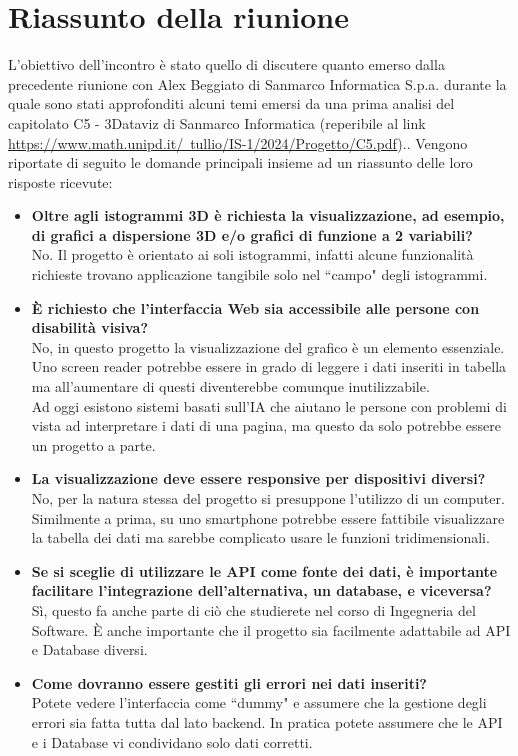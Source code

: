\section{Riassunto della riunione}
L'obiettivo dell'incontro  è stato quello di discutere quanto emerso dalla precedente riunione con 
    Alex Beggiato di Sanmarco Informatica S.p.a. durante la quale sono stati approfonditi alcuni temi emersi da una prima analisi del capitolato C5 - 3Dataviz di Sanmarco Informatica (reperibile al link \href{https://www.math.unipd.it/~tullio/IS-1/2024/Progetto/C5.pdf}{https://www.math.unipd.it/~tullio/IS-1/2024/Progetto/C5.pdf})..
Vengono riportate di seguito le domande principali insieme ad un riassunto delle loro risposte ricevute:
\begin{itemize}
    \item \textbf{Oltre agli istogrammi 3D è richiesta la visualizzazione, ad esempio, di grafici a dispersione 3D e/o grafici di funzione a 2 variabili?}\\
    No. Il progetto è orientato ai soli istogrammi, infatti alcune funzionalità richieste trovano applicazione tangibile solo nel ``campo" degli istogrammi.
    \item \textbf{È richiesto che l'interfaccia Web sia accessibile alle persone con disabilità visiva?}\\
    No, in questo progetto la visualizzazione del grafico è un elemento essenziale. Uno screen reader potrebbe essere in grado di leggere i dati inseriti in tabella ma all'aumentare di questi diventerebbe comunque inutilizzabile.\\
    Ad oggi esistono sistemi basati sull'IA che aiutano le persone con problemi di vista ad interpretare i dati di una pagina, ma questo da solo potrebbe essere un progetto a parte.
    \item \textbf{La visualizzazione deve essere responsive per dispositivi diversi?}\\
    No, per la natura stessa del progetto si presuppone l'utilizzo di un computer.\\
    Similmente a prima, su uno smartphone potrebbe essere fattibile visualizzare la tabella dei dati ma sarebbe complicato usare le funzioni tridimensionali.
    \item \textbf{Se si sceglie di utilizzare le API come fonte dei dati, è importante facilitare l'integrazione dell'alternativa, un database, e viceversa?}\\
    Sì, questo fa anche parte di ciò che studierete nel corso di Ingegneria del Software. È anche importante che il progetto sia facilmente adattabile ad API e Database diversi.
    \item \textbf{Come dovranno essere gestiti gli errori nei dati inseriti?}\\
    Potete vedere l'interfaccia come ``dummy" e assumere che la gestione degli errori sia fatta tutta dal lato backend. In pratica potete assumere che le API e i Database vi condividano solo dati corretti.
\end{itemize}

